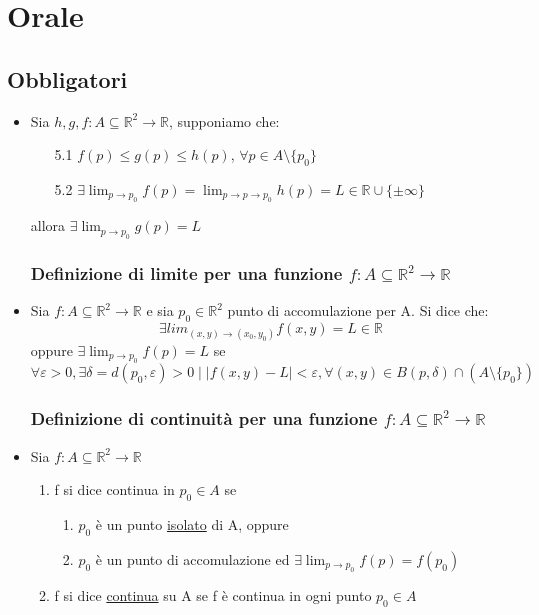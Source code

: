 \documentclass{report}
\newcommand{\ace}{\`e }
\newcommand{\aca}{\`a }
\newcommand{\Ins}[1]{\mathbb{#1}}
\newcommand{\R}{\Ins{R}}
\newcommand{\f}{f: A \subseteq \R^2 \to \R}
\begin{document}
  \tableofcontents
  \chapter{Orale}
  \section{Obbligatori}
  \begin{itemize}
    \subsection{TDC}
    \item Sia $h,g,\f$, supponiamo che:
          \begin{itemize}
            \item[5.1] $f(p) \leq g(p) \leq h(p)$, $\forall p \in A \setminus \{p_0\}$
            \item[5.2] $\exists\lim_{p \to p_0} f(p) = \lim_{p \to p\to p_0} h(p) = L \in \R \cup \{\pm \infty\}$
          \end{itemize}
          allora $\exists \lim_{p \to p_0} g(p) = L$

    \subsection{Definizione di limite per una funzione $\f$}
    \item Sia $\f$ e sia $p_0 \in \R^2$ punto di accomulazione per A. Si dice che:
          $$\exists lim_{(x,y)\to (x_0,y_0)} f(x,y) = L \in \R$$
          oppure $\exists \lim_{p \to p_0} f(p) = L$ se 
          $$\forall \varepsilon > 0, \exists \delta = d(p_0,\varepsilon) > 0 \mid 
          \lvert f(x,y)-L\rvert < \varepsilon, \forall (x,y) \in B(p,\delta) \cap (A \setminus \{p_0\})$$

    \subsection{Definizione di continuit\aca per una funzione $\f$}
    \item Sia $\f$
          \begin{enumerate}
            \item f si dice continua in $p_0 \in A$ se 
            \begin{enumerate}
              \item $p_0$ \ace un punto \underline{isolato} di A, oppure
              \item $p_0$ \ace un punto di accomulazione ed $\exists \lim_{p \to p_0} f(p) = f(p_0)$
            \end{enumerate}
            \item f si dice \underline{continua} su A se f \ace continua in ogni punto $p_0 \in A$
          \end{enumerate}


\end{itemize}
\end{document}

